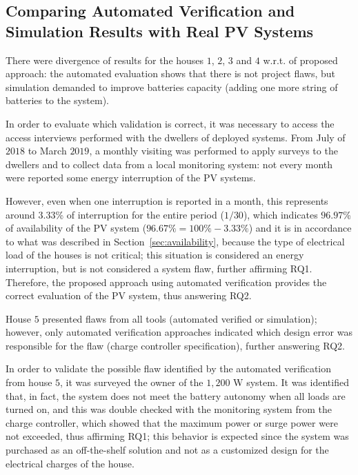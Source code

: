 \subsection{Comparing Automated Verification and Simulation Results with Real PV Systems}

There were divergence of results for the houses $1$, $2$, $3$ and $4$ w.r.t. of proposed approach: the automated evaluation shows that there is not project flaws, but simulation demanded to improve batteries capacity (adding one more string of batteries to the system). 

In order to evaluate which validation is correct, it was necessary to access the access interviews performed with the dwellers of deployed systems. From July of $2018$ to March $2019$, a monthly visiting was performed to apply surveys to the dwellers and to collect data from a local monitoring system: not every month were reported some energy interruption of the PV systems. 

However, even when one interruption is reported in a month, this represents around $3.33$\% of interruption for the entire period ($1/30$), which indicates $96.97$\% of availability of the PV system ($96.67\% = 100\%-3.33\%$) and it is in accordance to what was described in Section~\ref{sec:availability}, because the type of electrical load of the houses is not critical; this situation is considered an energy interruption, but is not considered a system flaw, further affirming RQ1. Therefore, the proposed approach using automated verification provides the correct evaluation of the PV system, thus answering RQ2.

House $5$ presented flaws from all tools (automated verified or simulation); however, only automated verification approaches indicated which design error was responsible for the flaw (charge controller specification), further answering RQ2.

In order to validate the possible flaw identified by the automated verification from house $5$, it was surveyed the owner of the $1,200$ W system. It was identified that, in fact, the system does not meet the battery autonomy when all loads are turned on, and this was double checked with the monitoring system from the charge controller, which showed that the maximum power or surge power were not exceeded, thus affirming RQ1; this behavior is expected since the system was purchased as an off-the-shelf solution and not as a customized design for the electrical charges of the house. 

%
